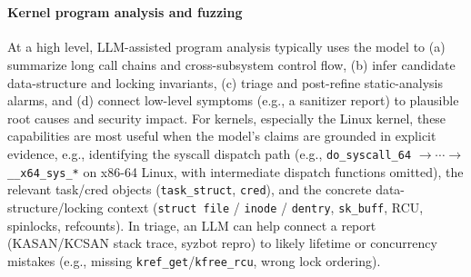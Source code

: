 ~
~

\begin{tcolorbox}[colback=gray!8, colframe=gray!55, boxrule=0.4pt, left=1mm, right=1mm, top=0.8mm, bottom=0.8mm, title=Key findings]
\end{tcolorbox}

\paragraph{Kernel program analysis and fuzzing} 


At a high level, LLM-assisted program analysis typically uses the model to (a) summarize long call chains and cross-subsystem control flow, (b) infer candidate data-structure and locking invariants, (c) triage and post-refine static-analysis alarms, and (d) connect low-level symptoms (e.g., a sanitizer report) to plausible root causes and security impact. 
For kernels, especially the Linux kernel, these capabilities are most useful when the model’s claims are grounded in explicit evidence, e.g., identifying the syscall dispatch path
(e.g., \texttt{do\_syscall\_64} $\rightarrow \cdots \rightarrow$\texttt{\_\_x64\_sys\_*} on x86-64 Linux, with intermediate dispatch functions omitted), 
the relevant task/cred objects (\texttt{task\_struct}, \texttt{cred}), and the concrete data-structure/locking context (\texttt{struct file} / \texttt{inode} / \texttt{dentry}, \texttt{sk\_buff}, RCU, spinlocks, refcounts). 
In triage, an LLM can help connect a report (KASAN/KCSAN stack trace, syzbot repro) to likely lifetime or concurrency mistakes (e.g., missing \texttt{kref\_get}/\texttt{kfree\_rcu}, wrong lock ordering). %

